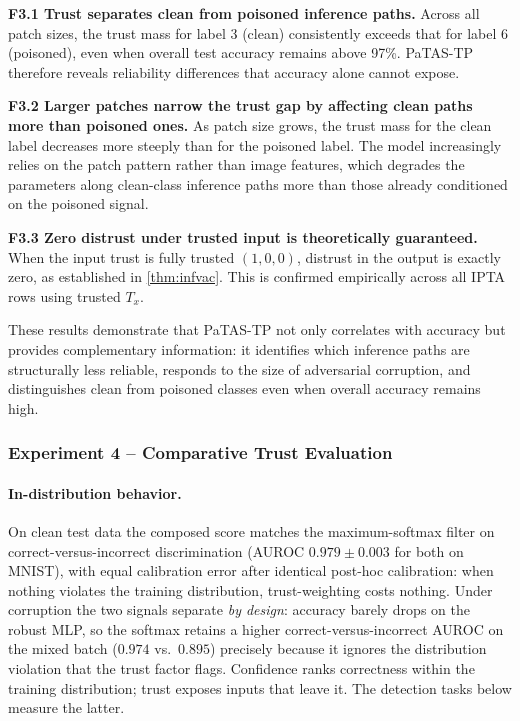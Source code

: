\begin{tcolorbox}[title=Key findings -- Experiment 3, colback=gray!5,
colframe=gray!40, fonttitle=\bfseries, left=4pt, right=4pt,
top=4pt, bottom=4pt]

\textbf{F3.1 Trust separates clean from poisoned inference paths.} Across all patch sizes, the trust mass for label 3 (clean) consistently exceeds that for label 6 (poisoned), even when overall test accuracy remains above 97\%. \ac{PaTAS-TP} therefore reveals reliability differences that accuracy alone cannot expose.

\medskip
\textbf{F3.2 Larger patches narrow the trust gap by affecting clean paths
more than poisoned ones.} As patch size grows, the trust mass for the clean label decreases more steeply than for the poisoned label. The model increasingly relies on the patch pattern rather than image features, which degrades the parameters along clean-class inference paths more than those already conditioned on
the poisoned signal.

\medskip
\textbf{F3.3 Zero distrust under trusted input is theoretically guaranteed.} When the input trust is fully trusted $(1,0,0)$, distrust in the output is exactly zero, as established in \cref{thm:infvac}. This is confirmed empirically across all IPTA rows using trusted $T_x$.
\end{tcolorbox}

These results demonstrate that \ac{PaTAS-TP} not only correlates with accuracy but provides complementary information: it identifies which inference paths are structurally less reliable, responds to the size of adversarial corruption, and distinguishes clean from poisoned classes even when overall accuracy remains high.

\subsubsection*{Experiment 4 -- Comparative Trust Evaluation}

\paragraph*{In-distribution behavior.}
On clean test data the composed score matches the maximum-softmax filter on correct-versus-incorrect discrimination (AUROC $0.979 \pm 0.003$ for both on MNIST), with equal calibration error after identical post-hoc calibration: when nothing violates the training distribution, trust-weighting costs nothing. Under corruption the two signals separate \emph{by design}: accuracy barely drops on the robust MLP, so the softmax retains a higher correct-versus-incorrect AUROC on the mixed batch ($0.974$ vs.\ $0.895$) precisely because it ignores the distribution violation that the trust factor flags. Confidence ranks correctness within the training distribution; trust exposes inputs that leave it. The detection tasks below measure the latter.

